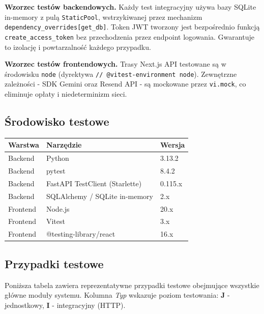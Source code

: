 \documentclass[12pt,a4paper]{article}
\begin{document}
\bigskip

\textbf{Wzorzec testów backendowych.} Każdy test integracyjny używa bazy SQLite in-memory z pulą \texttt{StaticPool}, wstrzykiwanej przez mechanizm \texttt{dependency\_overrides[get\_db]}. Token JWT tworzony jest bezpośrednio funkcją \texttt{create\_access\_token} bez przechodzenia przez endpoint logowania. Gwarantuje to izolację i powtarzalność każdego przypadku.

\textbf{Wzorzec testów frontendowych.} Trasy Next.js API testowane są w środowisku \texttt{node} (dyrektywa \texttt{// @vitest-environment node}). Zewnętrzne zależności - SDK Gemini oraz Resend API - są mockowane przez \texttt{vi.mock}, co eliminuje opłaty i niedeterminizm sieci.

\subsection{Środowisko testowe}

\begin{center}
\begin{tabular}{lll}
\toprule
\textbf{Warstwa} & \textbf{Narzędzie} & \textbf{Wersja} \\
\midrule
Backend & Python & 3.13.2 \\
Backend & pytest & 8.4.2 \\
Backend & FastAPI TestClient (Starlette) & 0.115.x \\
Backend & SQLAlchemy / SQLite in-memory & 2.x \\
Frontend & Node.js & 20.x \\
Frontend & Vitest & 3.x \\
Frontend & @testing-library/react & 16.x \\
\bottomrule
\end{tabular}
\end{center}

\subsection{Przypadki testowe}

Poniższa tabela zawiera reprezentatywne przypadki testowe obejmujące wszystkie główne moduły systemu. Kolumna \emph{Typ} wskazuje poziom testowania: \textbf{J} - jednostkowy, \textbf{I} - integracyjny (HTTP).
\end{document}
